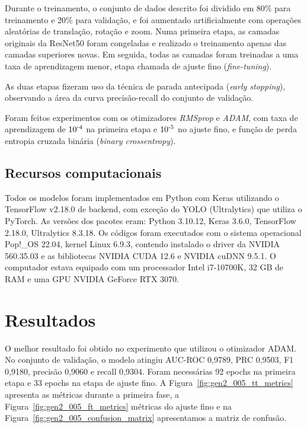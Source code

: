 \documentclass[12pt]{article}
\begin{document}
Durante o treinamento, o conjunto de dados descrito foi dividido em 80\% para treinamento e 20\% para validação, e foi aumentado artificialmente com operações aleatórias de translação, rotação e zoom. Numa primeira etapa, as camadas originais da ResNet50 foram congeladas e realizado o treinamento apenas das camadas superiores novas. Em seguida, todas as camadas foram treinadas a uma taxa de aprendizagem menor, etapa chamada de ajuste fino (\emph{fine-tuning}).

As duas etapas fizeram uso da técnica de parada antecipada (\emph{early stopping}), observando a área da curva precisão-recall do conjunto de validação.

Foram feitos experimentos com os otimizadores \emph{RMSprop} e \emph{ADAM}, com taxa de aprendizagem de $10\textsuperscript{-4}$ na primeira etapa e $10\textsuperscript{-5}$ no ajuste fino, e função de perda entropia cruzada binária (\emph{binary crossentropy}).

\subsection{Recursos computacionais}
\label{sec:resources}

Todos os modelos foram implementados em Python com Keras utilizando o TensorFlow v2.18.0 de backend, com exceção do YOLO (Ultralytics) que utiliza o PyTorch. As versões dos pacotes eram: Python 3.10.12, Keras 3.6.0, TensorFlow 2.18.0, Ultralytics 8.3.18.
Os códigos foram executados com o sistema operacional Pop!\_OS 22.04, kernel Linux 6.9.3, contendo instalado o driver da NVIDIA 560.35.03 e as bibliotecas NVIDIA CUDA 12.6 e NVIDIA cuDNN 9.5.1.
O computador estava equipado com um processador Intel i7-10700K, 32 GB de RAM e uma GPU NVIDIA GeForce RTX 3070.

\section{Resultados}
\label{sec:results}


O melhor resultado foi obtido no experimento que utilizou o otimizador ADAM. No conjunto de validação, o modelo atingiu AUC-ROC 0,9789, PRC 0,9503, F1 0,9180, precisão 0,9060 e recall 0,9304. Foram necessárias 92 epochs na primeira etapa e 33 epochs na etapa de ajuste fino. A Figura~\ref{fig:gen2_005_tt_metrics} apresenta as métricas durante a primeira fase, a Figura~\ref{fig:gen2_005_ft_metrics} métricas do ajuste fino e na Figura~\ref{fig:gen2_005_confusion_matrix} apresentamos a matriz de confusão.
\end{document}
